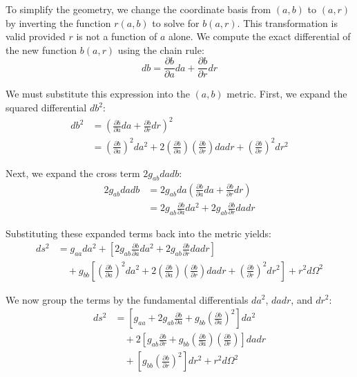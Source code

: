 \documentclass[11pt, a4paper]{report}
\begin{document}
To simplify the geometry, we change the coordinate basis from $(a,b)$ to $(a,r)$ by inverting the function $r(a,b)$ to solve for $b(a,r)$. This transformation is valid provided $r$ is not a function of $a$ alone. We compute the exact differential of the new function $b(a,r)$ using the chain rule:
\begin{equation}
db = \frac{\partial b}{\partial a} da + \frac{\partial b}{\partial r} dr
\end{equation}

We must substitute this expression into the $(a,b)$ metric. First, we expand the squared differential $db^2$:
\begin{align}
db^2 &= \left( \frac{\partial b}{\partial a} da + \frac{\partial b}{\partial r} dr \right)^2 \nonumber \\
&= \left( \frac{\partial b}{\partial a} \right)^2 da^2 + 2 \left( \frac{\partial b}{\partial a} \right) \left( \frac{\partial b}{\partial r} \right) da dr + \left( \frac{\partial b}{\partial r} \right)^2 dr^2
\end{align}

Next, we expand the cross term $2g_{ab} da db$:
\begin{align}
2g_{ab} da db &= 2g_{ab} da \left( \frac{\partial b}{\partial a} da + \frac{\partial b}{\partial r} dr \right) \nonumber \\
&= 2g_{ab} \frac{\partial b}{\partial a} da^2 + 2g_{ab} \frac{\partial b}{\partial r} da dr
\end{align}

Substituting these expanded terms back into the metric yields:
\begin{align}
ds^{2} &= g_{aa} da^{2} + \left[ 2g_{ab} \frac{\partial b}{\partial a} da^2 + 2g_{ab} \frac{\partial b}{\partial r} da dr \right] \nonumber \\
&\quad + g_{bb} \left[ \left( \frac{\partial b}{\partial a} \right)^2 da^2 + 2 \left( \frac{\partial b}{\partial a} \right) \left( \frac{\partial b}{\partial r} \right) da dr + \left( \frac{\partial b}{\partial r} \right)^2 dr^2 \right] + r^{2}d\Omega^{2}
\end{align}

We now group the terms by the fundamental differentials $da^2$, $da dr$, and $dr^2$:
\begin{align}
ds^{2} &= \left[ g_{aa} + 2g_{ab} \frac{\partial b}{\partial a} + g_{bb} \left( \frac{\partial b}{\partial a} \right)^2 \right] da^{2} \nonumber \\
&\quad + 2 \left[ g_{ab} \frac{\partial b}{\partial r} + g_{bb} \left( \frac{\partial b}{\partial a} \right) \left( \frac{\partial b}{\partial r} \right) \right] da dr \nonumber \\
&\quad + \left[ g_{bb} \left( \frac{\partial b}{\partial r} \right)^2 \right] dr^{2} + r^{2}d\Omega^{2}
\end{align}
\end{document}
